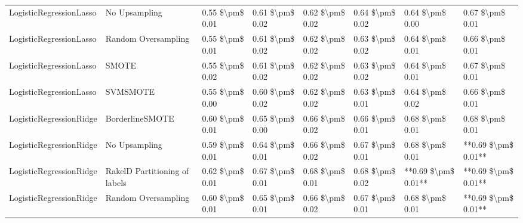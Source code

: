 \begin{tabular}{llllllll}
        LogisticRegressionLasso &                 No Upsampling & 0.55 \$\textbackslash pm\$ 0.01 &           0.61 \$\textbackslash pm\$ 0.02 &       0.62 \$\textbackslash pm\$ 0.02 &        0.64 \$\textbackslash pm\$ 0.02 &                         0.64 \$\textbackslash pm\$ 0.00 &     0.67 \$\textbackslash pm\$ 0.01 \\
        LogisticRegressionLasso &           Random Oversampling & 0.55 \$\textbackslash pm\$ 0.01 &           0.61 \$\textbackslash pm\$ 0.02 &       0.62 \$\textbackslash pm\$ 0.02 &        0.63 \$\textbackslash pm\$ 0.02 &                         0.64 \$\textbackslash pm\$ 0.01 &     0.66 \$\textbackslash pm\$ 0.01 \\
        LogisticRegressionLasso &                         SMOTE & 0.55 \$\textbackslash pm\$ 0.02 &           0.61 \$\textbackslash pm\$ 0.02 &       0.62 \$\textbackslash pm\$ 0.02 &        0.63 \$\textbackslash pm\$ 0.02 &                         0.64 \$\textbackslash pm\$ 0.01 &     0.67 \$\textbackslash pm\$ 0.01 \\
        LogisticRegressionLasso &                      SVMSMOTE & 0.55 \$\textbackslash pm\$ 0.00 &           0.60 \$\textbackslash pm\$ 0.02 &       0.62 \$\textbackslash pm\$ 0.02 &        0.63 \$\textbackslash pm\$ 0.01 &                         0.64 \$\textbackslash pm\$ 0.02 &     0.66 \$\textbackslash pm\$ 0.01 \\
        LogisticRegressionRidge &               BorderlineSMOTE & 0.60 \$\textbackslash pm\$ 0.01 &           0.65 \$\textbackslash pm\$ 0.00 &       0.66 \$\textbackslash pm\$ 0.02 &        0.66 \$\textbackslash pm\$ 0.01 &                         0.68 \$\textbackslash pm\$ 0.01 &     0.68 \$\textbackslash pm\$ 0.01 \\
        LogisticRegressionRidge &                 No Upsampling & 0.59 \$\textbackslash pm\$ 0.01 &           0.64 \$\textbackslash pm\$ 0.01 &       0.66 \$\textbackslash pm\$ 0.02 &        0.67 \$\textbackslash pm\$ 0.01 &                         0.68 \$\textbackslash pm\$ 0.01 & **0.69 \$\textbackslash pm\$ 0.01** \\
        LogisticRegressionRidge & RakelD Partitioning of labels & 0.62 \$\textbackslash pm\$ 0.01 &           0.67 \$\textbackslash pm\$ 0.01 &       0.68 \$\textbackslash pm\$ 0.01 &        0.68 \$\textbackslash pm\$ 0.02 &                     **0.69 \$\textbackslash pm\$ 0.01** & **0.69 \$\textbackslash pm\$ 0.01** \\
        LogisticRegressionRidge &           Random Oversampling & 0.60 \$\textbackslash pm\$ 0.01 &           0.65 \$\textbackslash pm\$ 0.01 &       0.66 \$\textbackslash pm\$ 0.02 &        0.67 \$\textbackslash pm\$ 0.01 &                         0.68 \$\textbackslash pm\$ 0.01 & **0.69 \$\textbackslash pm\$ 0.01** \\

\end{tabular}
